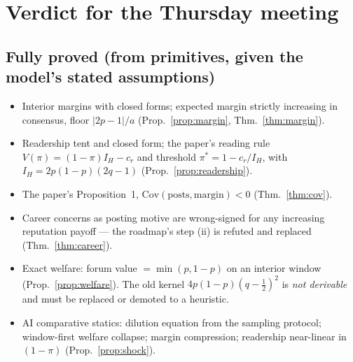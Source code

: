 \documentclass[11pt]{article}
\theoremstyle{remark}
\newcommand{\Cov}{\mathrm{Cov}}
\begin{document}
\section{Verdict for the Thursday meeting}
\label{sec:verdict}

\subsection*{Fully proved (from primitives, given the model's stated assumptions)}
\begin{itemize}[itemsep=1pt]
\item Interior margins with closed forms; expected margin strictly increasing in
consensus, floor $|2p-1|/a$ (Prop.~\ref{prop:margin}, Thm.~\ref{thm:margin}).
\item Readership tent and closed form; the paper's reading rule
$V(\pi)=(1-\pi)I_H-c_r$ and threshold $\pi^*=1-c_r/I_H$, with
$I_H=2p(1-p)(2q-1)$ (Prop.~\ref{prop:readership}).
\item The paper's Proposition~1, $\Cov(\text{posts},\text{margin})<0$
(Thm.~\ref{thm:cov}).
\item Career concerns as posting motive are wrong-signed for any increasing
reputation payoff --- the roadmap's step (ii) is refuted and replaced
(Thm.~\ref{thm:career}).
\item Exact welfare: forum value $=\min(p,1-p)$ on an interior window
(Prop.~\ref{prop:welfare}). The old kernel $4p(1-p)(q-\tfrac12)^2$ is
\emph{not derivable} and must be replaced or demoted to a heuristic.
\item AI comparative statics: dilution equation from the sampling protocol;
window-first welfare collapse; margin compression; readership near-linear in
$(1-\pi)$ (Prop.~\ref{prop:shock}).
\end{itemize}
\end{document}
